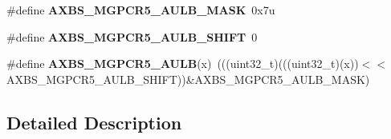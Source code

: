 \begin{DoxyCompactItemize}
\item 
\#define {\bfseries A\+X\+B\+S\+\_\+\+M\+G\+P\+C\+R5\+\_\+\+A\+U\+L\+B\+\_\+\+M\+A\+SK}~0x7u\hypertarget{group__AXBS__Register__Masks_gaea6c5a570e0ec08d6419d8da4e6d82fd}{}\label{group__AXBS__Register__Masks_gaea6c5a570e0ec08d6419d8da4e6d82fd}

\item 
\#define {\bfseries A\+X\+B\+S\+\_\+\+M\+G\+P\+C\+R5\+\_\+\+A\+U\+L\+B\+\_\+\+S\+H\+I\+FT}~0\hypertarget{group__AXBS__Register__Masks_gab23b7b12e97e5a14e012697fc5b4ee49}{}\label{group__AXBS__Register__Masks_gab23b7b12e97e5a14e012697fc5b4ee49}

\item 
\#define {\bfseries A\+X\+B\+S\+\_\+\+M\+G\+P\+C\+R5\+\_\+\+A\+U\+LB}(x)~(((uint32\+\_\+t)(((uint32\+\_\+t)(x))$<$$<$A\+X\+B\+S\+\_\+\+M\+G\+P\+C\+R5\+\_\+\+A\+U\+L\+B\+\_\+\+S\+H\+I\+FT))\&A\+X\+B\+S\+\_\+\+M\+G\+P\+C\+R5\+\_\+\+A\+U\+L\+B\+\_\+\+M\+A\+SK)\hypertarget{group__AXBS__Register__Masks_gad8be8f658899ebea335f64937532371f}{}\label{group__AXBS__Register__Masks_gad8be8f658899ebea335f64937532371f}

\end{DoxyCompactItemize}


\subsection{Detailed Description}
